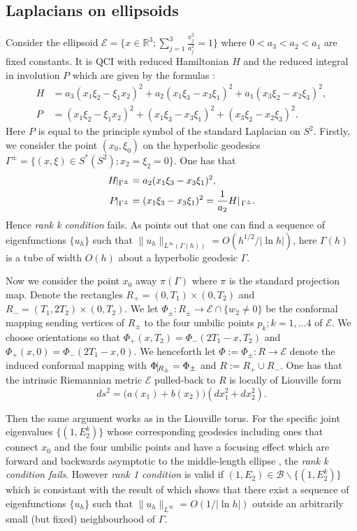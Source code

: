 \documentclass[12pt,reqno]{amsart}
\numberwithin{equation}{section}
\begin{document}
\subsection{Laplacians on ellipsoids}
Consider the ellipsoid $\mathcal{E}=\{x\in \mathbb{R}^3; \sum_{j=1}^3\frac{x^2_j}{a^2_j}=1\}$ where ${0<a_3<a_2<a_1}$ are fixed constants. It is QCI with reduced Hamiltonian $H$ and the reduced integral in involution $P$ which are given by the formulas \cite{Tot97}:
\begin{align*}
H&=a_3(x_1\xi_2-\xi_1x_2)^2+a_2(x_1\xi_3-x_3\xi_1)^2+a_1(x_3\xi_2-x_2\xi_3)^2,\\
P&=(x_1\xi_2-\xi_1x_2)^2+(x_1\xi_3-x_3\xi_1)^2+(x_3\xi_2-x_2\xi_3)^2.
\end{align*}
Here $P$ is equal to the principle symbol of the standard Laplacian on $S^2$.
Firstly, we consider the point  $(x_0, \xi_0)$  on the hyperbolic geodesics $\Gamma^{\pm}=\{(x,\xi)\in S^*(S^2); x_2=\xi_2=0\}$. One has that
\begin{align*}
H\vline_{\,\Gamma^\pm}&=a_2(x_1\xi_3-x_3\xi_1)^2,\\
P\vline_{\,\Gamma^\pm}&=(x_1\xi_3-x_3\xi_1)^2=\frac{1}{a_2}  H |_{\,\Gamma^\pm}.
\end{align*}
Hence {\em rank k condition} fails. As \cite{Tot97} points out that one can find a sequence of eigenfunctions $\{u_h\}$ such that $\|u_h\|_{L^\infty(\Gamma(h))}=O(h^{1/2}/|\ln h|)$, here $\Gamma(h)$ is a tube of width $O(h)$ about a hyperbolic geodesic $\Gamma$.


Now we consider the point $x_0$ away $\pi(\Gamma)$ where $\pi$ is the standard projection map. Denote the rectangles $R_+=(0, T_1)\times (0, T_2)$ and $R_-=(T_1, 2T_2)\times(0, T_2)$. We let $\Phi_\pm: R_\pm\to \mathcal{E}\cap \{w_2\neq 0\}$ be the conformal mapping sending vertices of $R_\pm$ to the four umbilic points $p_k; k=1,\dots 4$ of $\mathcal{E}$. We choose orientations so that $\Phi_+(x,T_2)=\Phi_-(2T_1-x,T_2)$ and $\Phi_+(x,0)=\Phi_-(2T_1-x,0)$. We henceforth let $\Phi:=\Phi_\pm: R\to \mathcal{E}$ denote the induced conformal mapping with $\Phi\vline_{R_\pm}=\Phi_{\pm}$ and $R:=R_+\cup R_-$. One has that the intrinsic Riemannian metric $\mathcal{E}$ pulled-back to $R$ is locally of Liouville form \cite{GT2020} $$ds^2=\big(a(x_1)+b(x_2)\big)(dx_1^2+dx_2^2).$$

Then the same argument works as in the Liouville torus. For the specific joint eigenvalues $\{(1, E_2^k)\}$ whose corresponding geodesics including ones that connect $x_0$ and the four umbilic points and have a focusing effect which are forward and backwards asymptotic to the middle-length ellipse \cite{Tot97, GT2020}, the {\em rank k condition fails}. However {\em rank 1 condition} is valid if $(1, E_2)\in \mathcal{B}\backslash\{(1,E_2^k)\}$ which is consistant with the result of \cite{Tot97} which shows that there exist a sequence of eigenfunctions $\{u_h\}$ such that $\|u_h\|_{L^\infty}=O(1/|\ln h|)$ outside an arbitrarily small (but fixed) neighbourhood of $\Gamma$.
\end{document}
